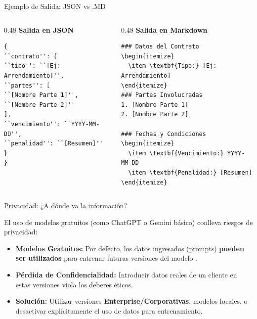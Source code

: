 \documentclass[aspectratio=169]{beamer}
\begin{document}
\begin{frame}[fragile]{Ejemplo de Salida: JSON vs .MD}


\begin{columns}[T]
\begin{column}{0.48\textwidth}
\textbf{Salida en JSON}
\begin{lstlisting}[basicstyle=\ttfamily\scriptsize]
{
``contrato'': {
``tipo'': ``[Ej: Arrendamiento]'',
``partes'': [
``[Nombre Parte 1]'',
``[Nombre Parte 2]''
],
``vencimiento'': ``YYYY-MM-DD'',
``penalidad'': ``[Resumen]''
}
}
\end{lstlisting}
\end{column}

\begin{column}{0.48\textwidth}
\textbf{Salida en Markdown}
\begin{lstlisting}[basicstyle=\ttfamily\scriptsize]
### Datos del Contrato
\begin{itemize}
  \item \textbf{Tipo:} [Ej: Arrendamiento]
\end{itemize}
### Partes Involucradas
1. [Nombre Parte 1]
2. [Nombre Parte 2]

### Fechas y Condiciones
\begin{itemize}
  \item \textbf{Vencimiento:} YYYY-MM-DD
  \item \textbf{Penalidad:} [Resumen]
\end{itemize}
\end{lstlisting}
\end{column}
\end{columns}

\end{frame}



\begin{frame}[fragile]{Privacidad: ¿A dónde va la información?}


El uso de modelos gratuitos (como ChatGPT o Gemini básico) conlleva riesgos de privacidad:

\begin{itemize}
  \item \textbf{Modelos Gratuitos:} Por defecto, los datos ingresados (prompts) \textbf{pueden ser utilizados} para entrenar futuras versiones del modelo \cite{geminiprivacy}.
  \item \textbf{Pérdida de Confidencialidad:} Introducir datos reales de un cliente en estas versiones viola los deberes éticos.
  \item \textbf{Solución:} Utilizar versiones \textbf{Enterprise/Corporativas}, modelos locales, o desactivar explícitamente el uso de datos para entrenamiento.
\end{itemize}
\end{frame}
\end{document}
